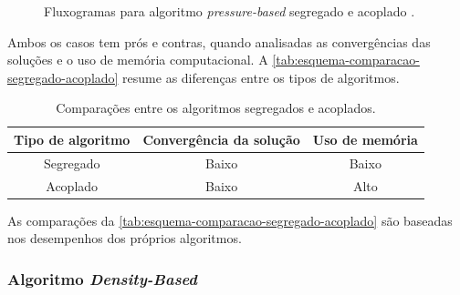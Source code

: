 \begin{figure}[!ht]
\caption[Fluxogramas para algoritmo \textit{pressure-based} segregado e acoplado.]{Fluxogramas para algoritmo \textit{pressure-based} segregado e acoplado \cite{fluent2021ansys}.}
\label{flux:pressure-based}
\end{figure}

Ambos os casos tem prós e contras, quando analisadas as convergências das soluções e o uso de memória computacional. A \autoref{tab:esquema-comparacao-segregado-acoplado} resume as diferenças entre os tipos de algoritmos.

\begin{table}[ht]
\centering
\vspace{0.5cm}
\caption[Comparações entre os algoritmos segregados e acoplados.]{Comparações entre os algoritmos segregados e acoplados.}
\begin{tabular}[c]{c|c|c}
Tipo de algoritmo & Convergência da solução & Uso de memória \\
\hline
Segregado & Baixo & Baixo \\
Acoplado & Baixo & Alto
\end{tabular}
\label{tab:esquema-comparacao-segregado-acoplado}
\end{table}

As comparações da \autoref{tab:esquema-comparacao-segregado-acoplado} são baseadas nos desempenhos dos próprios algoritmos.

\subsubsection{Algoritmo \textit{Density-Based}}

